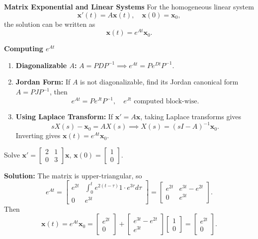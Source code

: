     \textbf{Matrix Exponential and Linear Systems}
    For the homogeneous linear system
    \[
    \mathbf{x}'(t) = A \mathbf{x}(t), \quad \mathbf{x}(0) = \mathbf{x}_0,
    \]
    the solution can be written as
    \[
    \mathbf{x}(t) = e^{At} \mathbf{x}_0.
    \]

    \textbf{Computing $e^{At}$}
    \begin{enumerate}
        \item \textbf{Diagonalizable $A$:} $A = P D P^{-1} \implies e^{At} = P e^{Dt} P^{-1}$.
        \item \textbf{Jordan Form:} If $A$ is not diagonalizable, find its Jordan canonical form $A = P J P^{-1}$, then
        \[
        e^{At} = P e^{Jt} P^{-1}, \quad e^{Jt} \text{ computed block-wise}.
        \]
        \item \textbf{Using Laplace Transform:}  
        If $\mathbf{x}' = A \mathbf{x}$, taking Laplace transforms gives
        \[
        s X(s) - \mathbf{x}_0 = A X(s) \implies X(s) = (sI - A)^{-1} \mathbf{x}_0.
        \]
        Inverting gives $\mathbf{x}(t) = e^{At} \mathbf{x}_0$.
    \end{enumerate}

    
    \begin{example}
      Solve $\mathbf{x}' = \begin{bmatrix} 2 & 1 \\ 0 & 3 \end{bmatrix} \mathbf{x}$, $\mathbf{x}(0) = \begin{bmatrix} 1 \\ 0 \end{bmatrix}$.

      \textbf{Solution:}
      The matrix is upper-triangular, so
      \[
      e^{At} = \begin{bmatrix} e^{2t} & \int_0^t e^{2(t-\tau)} 1 \cdot e^{3\tau} d\tau \\ 0 & e^{3t} \end{bmatrix} 
      = \begin{bmatrix} e^{2t} & e^{3t} - e^{2t} \\ 0 & e^{3t} \end{bmatrix}.
      \]
      Then
      \[
      \mathbf{x}(t) = e^{At} \mathbf{x}_0 = \begin{bmatrix} e^{2t} \\ 0 \end{bmatrix} + \begin{bmatrix} e^{3t} - e^{2t} \\ e^{3t} \end{bmatrix} \begin{bmatrix} 1 \\ 0 \end{bmatrix} = \begin{bmatrix} e^{2t} \\ 0 \end{bmatrix}.
      \]
    \end{example}


